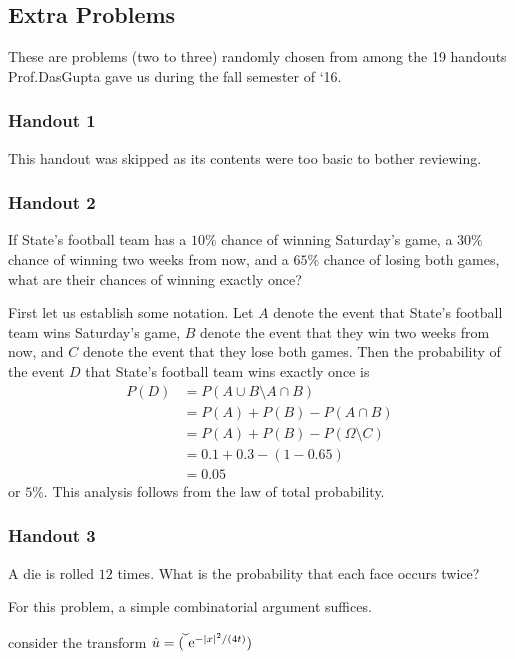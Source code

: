 \subsection{Extra Problems}
These are problems (two to three) randomly chosen from among the 19
handouts Prof.\@ DasGupta gave us during the fall semester of `16.
\subsubsection{Handout 1}
This handout was skipped as its contents were too basic to bother
reviewing.
\subsubsection{Handout 2}
\begin{problem}[Handout 2, \# 3]
  If State's football team has a \(10\%\) chance of winning Saturday's
  game, a \(30\%\) chance of winning two weeks from now, and a \(65\%\)
  chance of losing both games, what are their chances of winning exactly
  once?
\end{problem}
\begin{solution*}
  First let us establish some notation. Let \(A\) denote the event that
  State's football team wins Saturday's game, \(B\) denote the event that
  they win two weeks from now, and \(C\) denote the event that they lose
  both games. Then the probability of the event \(D\) that State's football
  team wins exactly once is
  \begin{align*}
    P(D)
    &=P(A\cup B\setminus A\cap B)\\
    &=P(A)+P(B)-P(A\cap B)\\
    &=P(A)+P(B)-P(\Omega\setminus C)\\
    &=0.1+0.3-(1-0.65)\\
    &=0.05
  \end{align*}
  or \(5\%\). This analysis follows from the law of total probability.
\end{solution*}

\subsubsection{Handout 3}
\begin{problem}[Handout 3, \# 4]
  A die is rolled \(12\) times. What is the probability that each face
  occurs twice?
\end{problem}
\begin{solution*}
  For this problem, a simple combinatorial argument suffices.

  consider the transform \(\hat u=\widecheck(\rme^{-|x|^2/(4t)})\)
\end{solution*}


